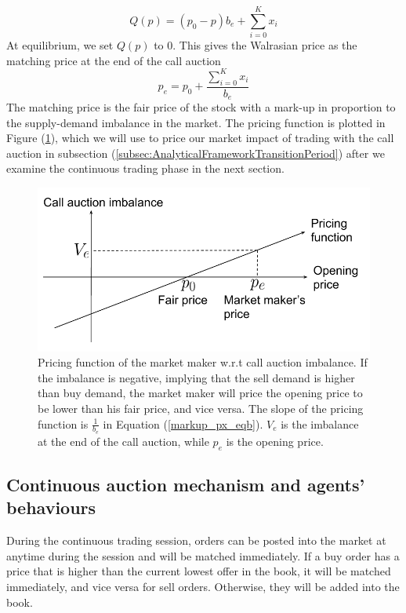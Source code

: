 \documentclass{article}
\begin{document}
\[
  Q(p) = (p_0 - p) b_e + \sum_{i=0}^K x_i
\]
At equilibrium, we set $Q(p)$ to 0. This gives the Walrasian price as the matching price at the end of the call auction
\begin{equation}\label{markup_px_eqb}
  p_e = p_0 + \frac{\sum_{i=0}^K x_i}{b_e}
\end{equation}
The matching price is the fair price of the stock with a mark-up in proportion to the supply-demand imbalance in the market. The pricing function is plotted in Figure (\ref{fig:mm_pricing_auction}), which we will use to price our market impact of trading with the call auction in subsection (\ref{subsec:AnalyticalFrameworkTransitionPeriod}) after we examine the continuous trading phase in the next section.

\begin{figure}[h]
  \includegraphics[width=\textwidth]{MMPricing}
  \caption{Pricing function of the market maker w.r.t call auction imbalance. If the imbalance is negative, implying that the sell demand is higher than buy demand, the market maker will price the opening price to be lower than his fair price, and vice versa. The slope of the pricing function is $\frac{1}{b_e}$ in Equation (\ref{markup_px_eqb}). $V_e$ is the imbalance at the end of the call auction, while $p_e$ is the opening price. }
  \label{fig:mm_pricing_auction}
\end{figure}

\subsection{Continuous auction mechanism and agents' behaviours}\label{subsec:AnalyticalFrameworkContinuousAuction}
During the continuous trading session, orders can be posted into the market at anytime during the session and will be matched immediately. If a buy order has a price that is higher than the current lowest offer in the book, it will be matched immediately, and vice versa for sell orders. Otherwise, they will be added into the book.
\end{document}
